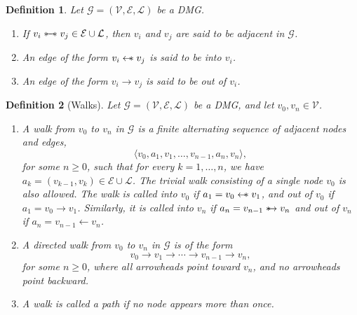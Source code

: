 \documentclass[accepted]{uai2025} %
\newtheorem{definition}{Definition}
\newcommand{\hus}{\mathrel{{\leftarrow\mkern-11mu\ast}}}
\newcommand{\suh}{\mathrel{{\ast\mkern-11mu\to}}}
\newcommand{\sus}{\mathrel{{\ast\mkern-11mu\relbar\mkern-9mu\relbar\mkern-11mu\ast}}}
\begin{document}
\begin{definition}  
Let \( \mathcal{G} = (\mathcal{V}, \mathcal{E}, \mathcal{L}) \) be a DMG.  
\begin{enumerate}  
    \item If \( v_i \sus  v_j \in \mathcal{E} \cup \mathcal{L} \), then \( v_i \) and \( v_j \) are said to be \emph{adjacent} in \( \mathcal{G} \).  
    \item An edge of the form \( v_i \hus  v_j \) is said to be \emph{into} \( v_i \).  
    \item An edge of the form \( v_i \rightarrow v_j \) is said to be \emph{out of} \( v_i \).  
\end{enumerate}  
\end{definition}  

\begin{definition} [Walks]  
Let \( \mathcal{G} = (\mathcal{V},\mathcal{E},\mathcal{L}) \) be a DMG, and let \( v_0, v_n \in \mathcal{V} \).  
\begin{enumerate}  
    \item A \emph{walk} from \( v_0 \) to \( v_n \) in \( \mathcal{G} \) is a finite alternating sequence of adjacent nodes and edges,  
    \[
    \langle v_0, a_1, v_1, \ldots, v_{n-1}, a_n, v_n \rangle,
    \]  
    for some \( n \geq 0 \), such that for every \( k = 1, \ldots, n \), we have \( a_k = (v_{k-1}, v_k) \in \mathcal{E} \cup \mathcal{L} \). The \emph{trivial walk} consisting of a single node \( v_0 \) is also allowed. The walk is called \emph{into} \( v_0 \) if \( a_1 = v_0 \hus  v_1 \), and \emph{out of} \( v_0 \) if \( a_1 = v_0 \rightarrow v_1 \). Similarly, it is called \emph{into} \( v_n \) if \( a_n = v_{n-1} \suh v_n \) and \emph{out of} \( v_n \) if \( a_n = v_{n-1} \leftarrow v_n \).  

    \item A \emph{directed walk} from \( v_0 \) to \( v_n \) in \( \mathcal{G} \) is of the form  
    \[
    v_0 \rightarrow v_1 \rightarrow \cdots \rightarrow v_{n-1} \rightarrow v_n,
    \]  
    for some \( n \geq 0 \), where all arrowheads point toward \( v_n \), and no arrowheads point backward.  

    \item A walk is called a \emph{path} if no node appears more than once.  
\end{enumerate}  
\end{definition}  
\end{document}

